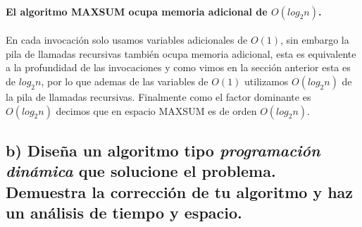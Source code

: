 \documentclass[12pt]{article}
\begin{document}
\paragraph{El algoritmo MAXSUM ocupa memoria adicional de $O(log_2n)$.} En cada invocación solo usamos variables adicionales de $O(1)$, sin embargo la pila de llamadas recursivas también ocupa memoria adicional, esta es equivalente a la profundidad de las invocaciones y como vimos en la sección anterior esta es de $log_2n$, por lo que ademas de las variables de $O(1)$ utilizamos $O(log_2n)$ de la pila de llamadas recursivas. Finalmente como el factor dominante es $O(log_2n)$ decimos que en espacio MAXSUM es de orden $O(log_2n)$.
\subsection{b) Diseña un algoritmo tipo \textit{programación dinámica} que solucione el problema. Demuestra la corrección de tu algoritmo y haz un análisis de tiempo y espacio.}
\end{document}
